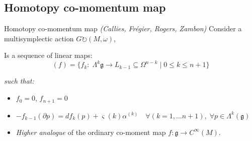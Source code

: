 \documentclass[beamer,10pt]{standalone}
\begin{document}
  \subsection{Homotopy co-momentum map}
  \begin{frame}[fragile,t]{Homotopy co-momentum map \emph{(Callies, Frégier, Rogers, Zambon)}}
		Consider a multisymplectic action $G \circlearrowright (M, \omega)$,
		\begin{defblock}				
			Is a sequence of linear maps:
			\begin{displaymath}
				(f)  = \big\lbrace f_k: \; \Lambda^k{\mathfrak g} \to L_{k-1} \subseteq \Omega^{n-k} 
				\;\big\vert\; 0\leq k \leq n+1  \big\rbrace
			\end{displaymath}
						
			\emph{such that:}
			\begin{itemize}
				\item $f_0 = 0 $, $f_{n+1} = 0$ %
				\item<2-> $-f_{k-1} (\partial p) = d f_k (p) + \varsigma(k) \alpha^{(k)} \quad \forall (k=1,\dots n+1), \; \forall p \in \Lambda^k(\mathfrak{g})$
			\end{itemize}
		\end{defblock}
		\begin{itemize}
			\item \emph{Higher analogue} of the ordinary co-moment map $f\colon \mathfrak{g}\rightarrow C^\infty(M)$.
		\end{itemize}
  \end{frame}
\end{document}
